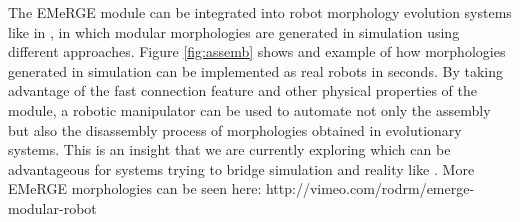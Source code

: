 \documentclass[sigconf]{acmart}
\begin{document}
The EMeRGE module can be integrated into robot morphology evolution systems like in \cite{Veenstra2017}, in which modular morphologies are generated in simulation using different approaches. Figure \ref{fig:assemb} shows and example of how morphologies generated in simulation can be implemented as real robots in seconds. By taking advantage of the fast connection feature and other physical properties of the module, a robotic manipulator can be used to automate not only the assembly but also the disassembly process of morphologies obtained in evolutionary systems. This is an insight that we are currently exploring which can be advantageous for systems trying to bridge simulation and reality like \cite{Koos2013}. More EMeRGE morphologies can be seen here: http://vimeo.com/rodrm/emerge-modular-robot





\end{document}
